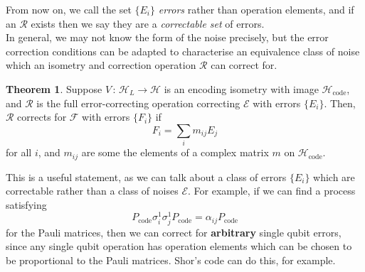 \documentclass[12pt,a4paper]{report}
\numberwithin{equation}{section}
\newcommand{\Pc}{P_{\text{code}}}
\newcommand{\Hcode}{\mathcal{H}_{\text{code}}}
\theoremstyle{definition}
\theoremstyle{theorem}
\newtheorem{theorem}{Theorem}[section]
\theoremstyle{theorem}
\theoremstyle{example}
\theoremstyle{definition}
\begin{document}
From now on, we call the set $\{E_{i}\}$ \textit{errors} rather than operation elements, and if an $\mathcal{R}$ exists then we say they are a \textit{correctable set} of errors.\\
In general, we may not know the form of the noise precisely, but the error correction conditions can be adapted to characterise an equivalence class of noise which an isometry and correction operation $\mathcal{R}$ can correct for.
\begin{theorem}
	Suppose $V\,:\,\mathcal{H}_{L}\to\mathcal{H}$ is an encoding isometry with image $\Hcode$, and $\mathcal{R}$ is the full error-correcting operation correcting $\mathcal{E}$ with errors $\{E_{i}\}$. Then, $\mathcal{R}$ corrects for $\mathcal{F}$ with errors $\{F_{i}\}$ if
	\begin{equation}
		F_{i}=\sum_{i}m_{ij}E_{j}
	\end{equation}
	for all $i$, and $m_{ij}$ are some the elements of a complex matrix $m$ on $\Hcode$.
\end{theorem}
This is a useful statement, as we can talk about a class of errors $\{E_{i}\}$ which are correctable rather than a class of noises $\mathcal{E}$. For example, if we can find a process satisfying
\begin{equation}
	\Pc \sigma_{i}^{1}\sigma_{j}^{1}\Pc=\alpha_{ij}\Pc
\end{equation}
for the Pauli matrices, then we can correct for \textbf{arbitrary} single qubit errors, since any single qubit operation has operation elements which can be chosen to be proportional to the Pauli matrices. Shor's code \cite{PhysRevA.52.R2493} can do this, for example.
\end{document}
